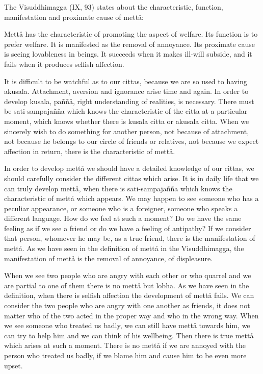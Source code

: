 \documentclass[12pt,twoside]{article}
\begin{document}
The Visuddhimagga (IX, 93) states about the characteristic, function,
manifestation and proximate cause of mett{\aa}:


\bigskip

Mett{\aa} has the characteristic of promoting the aspect of welfare. Its
function is to prefer welfare. It is manifested as the removal of
annoyance. Its proximate cause is seeing lovableness in beings. It
succeeds when it makes ill{}-will subside, and it fails when it
produces selfish affection. 


\bigskip

It is difficult to be watchful as to our cittas, because we are so used
to having akusala. Attachment, aversion and ignorance arise time and
again. In order to develop kusala, pa\~n\~n{\aa}, right understanding
of realities, is necessary. There must be sati{}-sampaja\~n\~na which
knows the characteristic of the citta at a particular moment, which
knows whether there is kusala citta or akusala citta. When we sincerely
wish to do something for another person, not because of attachment, not
because he belongs to our circle of friends or relatives, not because
we expect affection in return, there is the characteristic of
mett{\aa}. 

In order to develop mett{\aa} we should have a detailed knowledge of our
cittas, we should carefully consider the different cittas which arise.
It is in daily life that we can truly develop mett{\aa}, when there is
sati{}-sampaja\~n\~na which knows the characteristic of mett{\aa} which
appears. We may happen to see someone who has a peculiar appearance, or
someone who is a foreigner, someone who speaks a different language.
How do we feel at such a moment? Do we have the same feeling as if we
see a friend or do we have a feeling of antipathy? If we consider that
person, whomever he may be, as a true friend, there is the
manifestation of mett{\aa}. As we have seen in the definition of
mett{\aa} in the Visuddhimagga, the manifestation of mett{\aa} is the
removal of annoyance, of displeasure. 

When we see two people who are angry with each other or who quarrel and
we are partial to one of them there is no mett{\aa} but lobha. As we
have seen in the definition, when there is selfish affection the
development of mett{\aa} fails. We can consider the two people who are
angry with one another as friends, it does not matter who of the two
acted in the proper way and who in the wrong way. When we see someone
who treated us badly, we can still have mett{\aa} towards him, we can
try to help him and we can think of his wellbeing. Then there is true
mett{\aa} which arises at such a moment. There is no mett{\aa} if we
are annoyed with the person who treated us badly, if we blame him and
cause him to be even more upset. 
\end{document}
